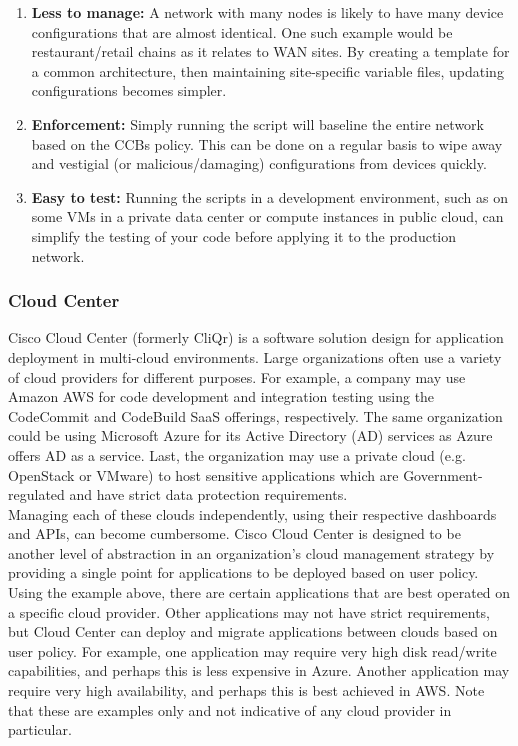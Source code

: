 \begin{enumerate}
  \item \textbf{Less to manage:} A network with many nodes is likely to have many
  device configurations that are almost identical. One such example would be
  restaurant/retail chains as it relates to WAN sites. By creating a template
  for a common architecture, then maintaining site-specific variable files,
  updating configurations becomes simpler.
  \item \textbf{Enforcement:} Simply running the script will baseline the entire
  network based on the CCBs policy. This can be done on a regular basis to wipe
  away and vestigial (or malicious/damaging) configurations from devices quickly.
  \item \textbf{Easy to test:} Running the scripts in a development environment, such
  as on some VMs in a private data center or compute instances in public cloud,
  can simplify the testing of your code before applying it to the production network.
\end{enumerate}

\subsubsection{Cloud Center}
Cisco Cloud Center (formerly CliQr) is a software solution design for
application deployment in multi-cloud environments. Large organizations often
use a variety of cloud providers for different purposes. For example, a
company may use Amazon AWS for code development and integration testing using
the CodeCommit and CodeBuild SaaS offerings, respectively. The same
organization could be using Microsoft Azure for its Active Directory (AD)
services as Azure offers AD as a service. Last, the organization may use a
private cloud (e.g. OpenStack or VMware) to host sensitive applications which
are Government-regulated and have strict data protection requirements. \\

Managing each of these clouds independently, using their respective dashboards
and APIs, can become cumbersome. Cisco Cloud Center is designed to be another
level of abstraction in an organization's cloud management strategy by
providing a single point for applications to be deployed based on user policy.
Using the example above, there are certain applications that are best operated
on a specific cloud provider. Other applications may not have strict
requirements, but Cloud Center can deploy and migrate applications between
clouds based on user policy. For example, one application may require very
high disk read/write capabilities, and perhaps this is less expensive in
Azure. Another application may require very high availability, and perhaps
this is best achieved in AWS. Note that these are examples only and not
indicative of any cloud provider in particular. \\


